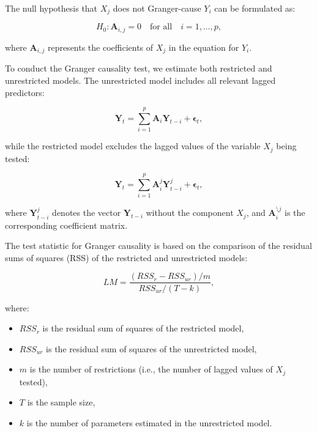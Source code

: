 \documentclass[11pt]{article}
\begin{document}
The null hypothesis that \(X_j\) does not Granger-cause \(Y_i\) can be formulated as:

\begin{equation}
H_0: \mathbf{A}_{i,j} = 0 \quad \text{for all} \quad i = 1, \ldots, p,
\end{equation}

where \(\mathbf{A}_{i,j}\) represents the coefficients of \(X_j\) in the equation for \(Y_i\).

To conduct the Granger causality test, we estimate both restricted and unrestricted models. The unrestricted model includes all relevant lagged predictors:

\begin{equation}
\mathbf{Y}_t = \sum_{i=1}^{p} \mathbf{A}_i \mathbf{Y}_{t-i} + \boldsymbol{\epsilon}_t,
\end{equation}

while the restricted model excludes the lagged values of the variable \(X_j\) being tested:

\begin{equation}
\mathbf{Y}_t = \sum_{i=1}^{p} \mathbf{A}_i^{j} \mathbf{Y}_{t-i}^{j} + \boldsymbol{\epsilon}_t,
\end{equation}

where \(\mathbf{Y}_{t-i}^{j}\) denotes the vector \(\mathbf{Y}_{t-i}\) without the component \(X_j\), and \(\mathbf{A}_i^{\setminus j}\) is the corresponding coefficient matrix.

The test statistic for Granger causality is based on the comparison of the residual sums of squares (RSS) of the restricted and unrestricted models:

\begin{equation}
LM = \frac{(RSS_r - RSS_{ur}) / m}{RSS_{ur} / (T - k)},
\end{equation}

where:
\begin{itemize}
    \item \(RSS_r\) is the residual sum of squares of the restricted model,
    \item \(RSS_{ur}\) is the residual sum of squares of the unrestricted model,
    \item \(m\) is the number of restrictions (i.e., the number of lagged values of \(X_j\) tested),
    \item \(T\) is the sample size,
    \item \(k\) is the number of parameters estimated in the unrestricted model.
\end{itemize}
\end{document}
